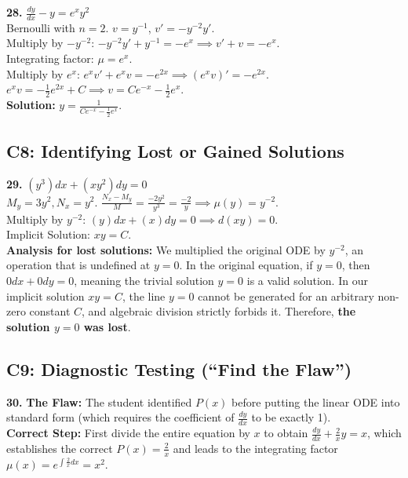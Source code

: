 \documentclass[11pt]{article}
\begin{document}
\vspace{0.5cm}
\textbf{28.} $\frac{dy}{dx} - y = e^x y^2$ \\
Bernoulli with $n=2$. $v = y^{-1}$, $v' = -y^{-2}y'$. \\
Multiply by $-y^{-2}$: $-y^{-2}y' + y^{-1} = -e^x \implies v' + v = -e^x$. \\
Integrating factor: $\mu = e^x$. \\
Multiply by $e^x$: $e^x v' + e^x v = -e^{2x} \implies (e^x v)' = -e^{2x}$. \\
$e^x v = -\frac{1}{2}e^{2x} + C \implies v = Ce^{-x} - \frac{1}{2}e^x$. \\
\textbf{Solution:} $y = \frac{1}{Ce^{-x} - \frac{1}{2}e^x}$.

\subsection*{C8: Identifying Lost or Gained Solutions}

\textbf{29.} $(y^3) dx + (xy^2) dy = 0$ \\
$M_y = 3y^2, N_x = y^2$. $\frac{N_x - M_y}{M} = \frac{-2y^2}{y^3} = \frac{-2}{y} \implies \mu(y) = y^{-2}$. \\
Multiply by $y^{-2}$: $(y) dx + (x) dy = 0 \implies d(xy) = 0$. \\
Implicit Solution: $xy = C$. \\
\textbf{Analysis for lost solutions:} We multiplied the original ODE by $y^{-2}$, an operation that is undefined at $y = 0$. In the original equation, if $y = 0$, then $0 dx + 0 dy = 0$, meaning the trivial solution $y = 0$ is a valid solution. In our implicit solution $xy = C$, the line $y = 0$ cannot be generated for an arbitrary non-zero constant $C$, and algebraic division strictly forbids it. Therefore, \textbf{the solution $y = 0$ was lost}.

\subsection*{C9: Diagnostic Testing (``Find the Flaw'')}

\textbf{30.} 
\textbf{The Flaw:} The student identified $P(x)$ before putting the linear ODE into standard form (which requires the coefficient of $\frac{dy}{dx}$ to be exactly 1). \\
\textbf{Correct Step:} First divide the entire equation by $x$ to obtain $\frac{dy}{dx} + \frac{2}{x}y = x$, which establishes the correct $P(x) = \frac{2}{x}$ and leads to the integrating factor $\mu(x) = e^{\int \frac{2}{x} dx} = x^2$.
\end{document}
